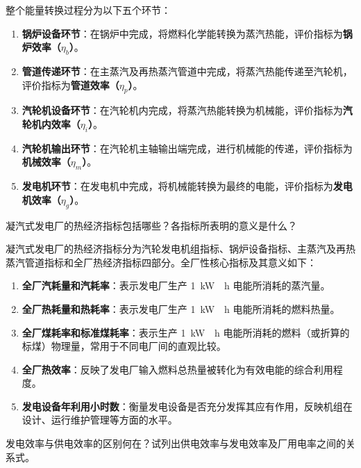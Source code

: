 \begin{solution}
整个能量转换过程分为以下五个环节：
\begin{enumerate}
  \item \textbf{锅炉设备环节}：在锅炉中完成，将燃料化学能转换为蒸汽热能，评价指标为\textbf{锅炉效率（\(\eta_b\)）}。
  \item \textbf{管道传递环节}：在主蒸汽及再热蒸汽管道中完成，将蒸汽热能传递至汽轮机，评价指标为\textbf{管道效率（\(\eta_p\)）}。
  \item \textbf{汽轮机设备环节}：在汽轮机内完成，将蒸汽热能转换为机械能，评价指标为\textbf{汽轮机内效率（\(\eta_i\)）}。
  \item \textbf{汽轮机输出环节}：在汽轮机主轴输出端完成，进行机械能的传递，评价指标为\textbf{机械效率（\(\eta_m\)）}。
  \item \textbf{发电机环节}：在发电机中完成，将机械能转换为最终的电能，评价指标为\textbf{发电机效率（\(\eta_g\)）}。
\end{enumerate}
\end{solution}

\begin{problem}
凝汽式发电厂的热经济指标包括哪些？各指标所表明的意义是什么？
\end{problem}

\begin{solution}
凝汽式发电厂的热经济指标分为汽轮发电机组指标、锅炉设备指标、主蒸汽及再热蒸汽管道指标和全厂热经济指标四部分。全厂性核心指标及其意义如下：
\begin{enumerate}
  \item \textbf{全厂汽耗量和汽耗率}：表示发电厂生产 \qty{1}{kW \cdot h} 电能所消耗的蒸汽量。
  \item \textbf{全厂热耗量和热耗率}：表示发电厂生产 \qty{1}{kW \cdot h} 电能所消耗的燃料热量。
  \item \textbf{全厂煤耗率和标准煤耗率}：表示生产 \qty{1}{kW \cdot h} 电能所消耗的燃料（或折算的标煤）物理量，常用于不同电厂间的直观比较。
  \item \textbf{全厂热效率}：反映了发电厂输入燃料总热量被转化为有效电能的综合利用程度。
  \item \textbf{发电设备年利用小时数}：衡量发电设备是否充分发挥其应有作用，反映机组在设计、运行维护管理等方面的水平。
\end{enumerate}
\end{solution}

\begin{problem}
发电效率与供电效率的区别何在？试列出供电效率与发电效率及厂用电率之间的关系式。
\end{problem}

